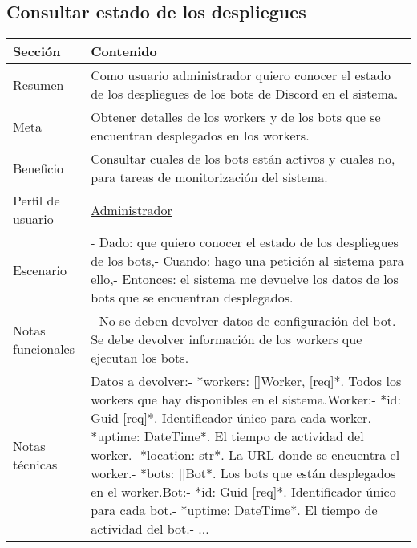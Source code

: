 \subsection{Consultar estado de los despliegues}

\begin{table}[H]
    \centering
    \begin{adjustbox}{max width=\textwidth}
    \begin{tabularx}{\textwidth}{|l|L|}
    \hline
        Sección & Contenido \\ \hline
        Resumen & Como usuario administrador quiero conocer el estado de los despliegues de los bots de Discord en el sistema. \\ \hline
        Meta & Obtener detalles de los workers y de los bots que se encuentran desplegados en los workers. \\ \hline
        Beneficio & Consultar cuales de los bots están activos y cuales no, para tareas de monitorización del sistema. \\ \hline
        Perfil de usuario & \hyperref[sec:personaAdmin]{Administrador} \\ \hline
        Escenario & - Dado: que quiero conocer el estado de los despliegues de los bots,\linebreak - Cuando: hago una petición al sistema para ello,\linebreak - Entonces: el sistema me devuelve los datos de los bots que se encuentran desplegados. \\ \hline
        Notas funcionales & - No se deben devolver datos de configuración del bot.\linebreak - Se debe devolver información de los workers que ejecutan los bots. \\ \hline
        Notas técnicas & Datos a devolver:\linebreak - *workers: []Worker, [req]*. Todos los workers que hay disponibles en el sistema.\linebreak \linebreak Worker:\linebreak - *id: Guid [req]*. Identificador único para cada worker.\linebreak - *uptime: DateTime*. El tiempo de actividad del worker.\linebreak - *location: str*. La URL donde se encuentra el worker.\linebreak - *bots: []Bot*. Los bots que están desplegados en el worker.\linebreak \linebreak Bot:\linebreak - *id: Guid [req]*. Identificador único para cada bot.\linebreak - *uptime: DateTime*. El tiempo de actividad del bot.\linebreak - ... \\ \hline

\end{tabularx}
\end{adjustbox}
\end{table}
